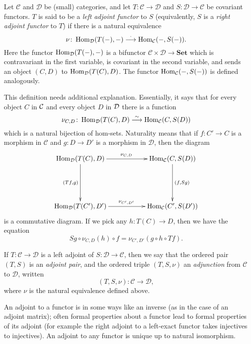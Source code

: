 Let $\mathcal{C}$ and $\mathcal{D}$ be (small) categories, and let $T:\mathcal{C} \to \mathcal{D}$ and $S:\mathcal{D} \to \mathcal{C}$ be covariant functors. $T$ is said to be a \emph{left adjoint functor} to $S$ (equivalently, $S$ is a \emph{right adjoint functor} to $T$) if there is a natural equivalence
\[
\nu\colon \mathop{\rm Hom}\nolimits_{\mathcal{D}}(T(-),-) \overset{\cdot}{\longrightarrow} \mathop{\rm Hom}\nolimits_{\mathcal{C}}(-,S(-)).
\]
Here the functor $\mathop{\rm Hom}\nolimits_{\mathcal{D}}(T(-),-)$ is a bifunctor $\mathcal{C}\times\mathcal{D}\to\mathbf{Set}$ which is contravariant in the first variable, is covariant in the second variable, and sends an object $(C,D)$ to $\mathop{\rm Hom}\nolimits_{\mathcal{D}}(T(C),D)$.  The functor $\mathop{\rm Hom}\nolimits_{\mathcal{C}}(-,S(-))$ is defined analogously.

This definition needs additional explanation.  Essentially, it says that for every object $C$ in $\cal{C}$ and every object $D$ in $\cal{D}$ there is a function 
\[
\nu_{C,D} \colon \mathop{\rm Hom}\nolimits_{\mathcal{D}}(T(C),D) \overset{\sim}{\longrightarrow} \mathop{\rm Hom}\nolimits_{\mathcal{C}}(C,S(D)) 
\]
which is a natural bijection of hom-sets.  Naturality means that if $f\colon C'\to C$ is a morphism in $\mathcal{C}$ and $g\colon D\to D'$ is a morphism in $\mathcal{D}$, then the diagram
\[\xymatrix{
\Hom_{\mathcal{D}}(T(C),D)\ar[dd]_{(Tf,g)}\ar[rr]^{\nu_{C,D}} &&
\Hom_{\mathcal{C}}(C,S(D))\ar[dd]^{(f,Sg)} \\ && \\
\Hom_{\mathcal{D}}(T(C'),D')\ar[rr]^{\nu_{C',D'}} &&
\Hom_{\mathcal{C}}(C',S(D')) \\
}\] 
is a commutative diagram.  If we pick any $h:T(C)\to D$, then we have the equation $$Sg\circ \nu_{C,D}(h)\circ f= \nu_{C',D'}(g\circ h\circ Tf).$$

If $T:\mathcal{C}\to\mathcal{D}$ is a left adjoint of $S:\mathcal{D}\to \mathcal{C}$, then we say that the ordered pair $(T,S)$ is an \emph{adjoint pair}, and the ordered triple $(T,S,\nu)$ an \emph{adjunction} from $\mathcal{C}$ to $\mathcal{D}$, written $$(T,S,\nu):\mathcal{C}\to \mathcal{D},$$ where $\nu$ is the natural equivalence defined above.  

An adjoint to a functor is in some ways like an inverse (as in the case of an adjoint matrix); often formal properties about a functor lead to formal properties of its adjoint (for example the right adjoint to a left-exact functor takes injectives to injectives).  An adjoint to any functor is unique up to natural isomorphism.